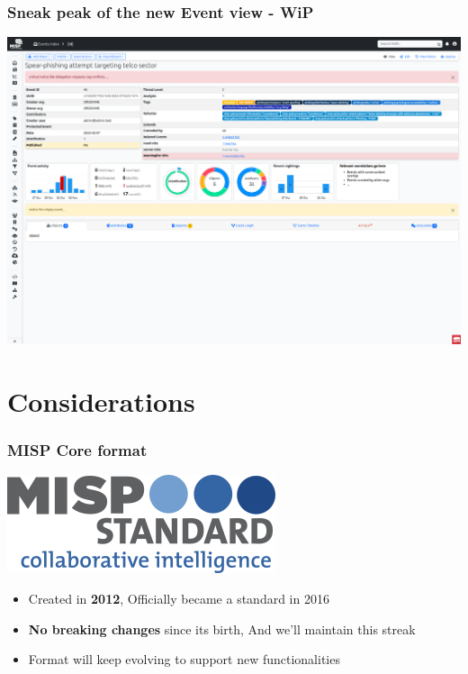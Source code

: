 \begin{frame}
    \frametitle{Sneak peak of the new Event view - WiP}
    \begin{center}
        \includegraphics[width=1.0\linewidth]{pictures/event-view.png}
    \end{center}
\end{frame}


\section{Considerations}
\begin{frame}
    \frametitle{MISP Core format}
    \vspace{-5em}
    \begin{center}
        \includegraphics[width=0.35\linewidth]{pictures/misp-standard.png}
    \end{center}
    \vspace{1em}
    \begin{itemize}
        \item Created in \textbf{2012}, Officially became a standard in 2016
        \item \textbf{No breaking changes} since its birth, And we'll maintain this streak
        \item Format will keep evolving to support new functionalities
    \end{itemize}
\end{frame}

